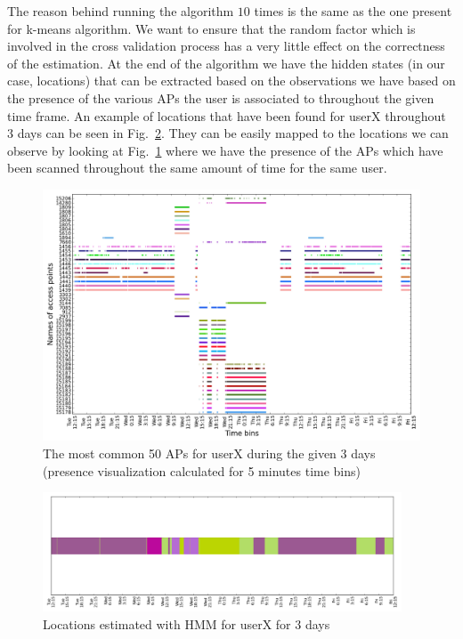 The reason behind running the algorithm $10$ times is the same as the one
present for k-means algorithm. We want to ensure that the random factor which is
involved in the cross validation process has a very little effect on the
correctness of the estimation. At the end of the algorithm we have the hidden
states (in our case, locations) that can be extracted based on the observations
we have based on the presence of the various APs the user is associated to
throughout the given time frame. An example of locations that have been found
for userX throughout $3$ days can be seen in Fig.~\ref{user_6_days1_2_3_hmm}.
They can be easily mapped to the locations we can observe by looking at
Fig.~\ref{user_6_days1_2_3_APs_presence} where we have the presence of the
APs which have been scanned throughout the same amount of time for the same user.
\begin{figure}[!h]
\centering
\includegraphics[width=\textwidth]{figures/hmm/user_6_sorted_3days_no_rssi_plot.png}
\caption{The most common 50 APs for userX during the given 3 days (presence
visualization calculated for 5 minutes time bins)}
\label{user_6_days1_2_3_APs_presence}
\end{figure}

\begin{figure}[!h]
\centering
\includegraphics[width=0.95\textwidth]{figures/hmm/hmm_locations_(5)_3days_plot.png}
\caption{Locations estimated with HMM for userX for 3 days}
\label{user_6_days1_2_3_hmm}
\end{figure}

